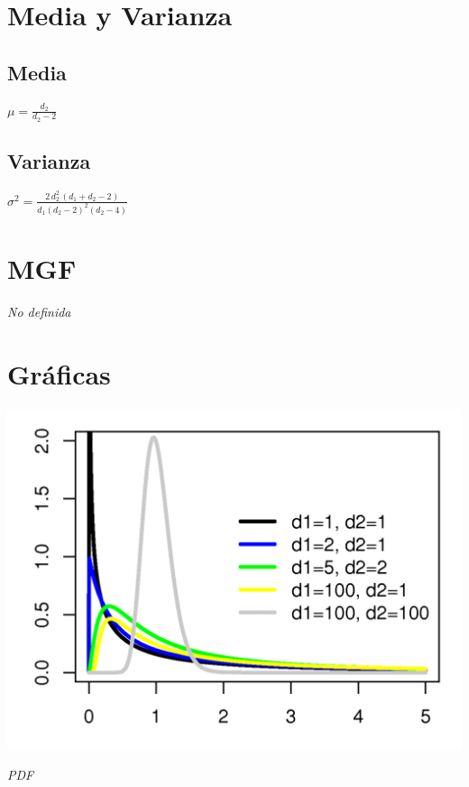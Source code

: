 \section{Media y Varianza}
\subsection{Media}
\begin{center}
$\mu = \frac{d_2}{d_2 - 2}$
\end{center}

\subsection{Varianza}
\begin{center}
	$\sigma^2 = {\frac {2\,d_{2}^{2}\,(d_{1}+d_{2}-2)}{d_{1}(d_{2}-2)^{2}(d_{2}-4)}}\!$
\end{center}
	
\section{MGF}
\begin{center}
	\textit{No definida}
\end{center}
	
\section{Gráficas}
\begin{center}
	\includegraphics[scale=1.5]{imgs/f-pdf.png}
	
	\textit{PDF}
\end{center}

